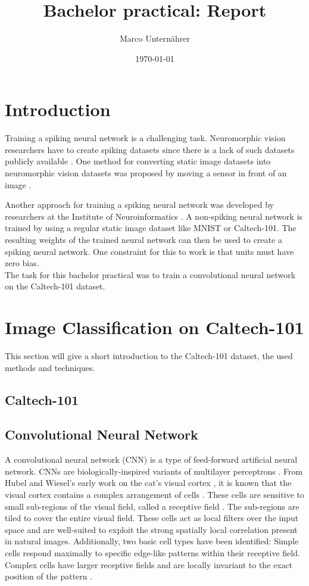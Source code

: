 \documentclass[a4paper, 11pt]{article}
\title{Bachelor practical: Report}
\author{Marco Unternährer}
\date{\today}
\begin{document}
\maketitle

\section{Introduction}

Training a spiking neural network is a challenging task.
Neuromorphic vision researchers have to create spiking datasets since there is a lack of such datasets publicly available .
One method for converting static image datasets into neuromorphic vision datasets was proposed by moving a sensor in front of an image \cite{Orchard2015}.

Another approach for training a spiking neural network was developed by researchers at the Institute of Neuroinformatics \cite{Diehl2015}.
A non-spiking neural network is trained by using a regular static image dataset like MNIST or Caltech-101.
The resulting weights of the trained neural network can then be used to create a spiking neural network.
One constraint for this to work is that units must have zero bias.\\

The task for this bachelor practical was to train a convolutional neural network on the Caltech-101 dataset.


\section{Image Classification on Caltech-101}
This section will give a short introduction to the Caltech-101 dataset, the used methods and techniques.

\subsection{Caltech-101}
\cite{Fei-Fei2007}


\subsection{Convolutional Neural Network}
A convolutional neural network (CNN) is a type of feed-forward artificial neural network.
CNNs are biologically-inspired variants of multilayer perceptrons \cite{DLCNN}.
From Hubel and Wiesel's early work on the cat's visual cortex \cite{Hubel1968}, it is known that the visual cortex contains a complex arrangement of cells \cite{DLCNN}.
These cells are sensitive to small sub-regions of the visual field, called a receptive field \cite{DLCNN}.
The sub-regions are tiled to cover the entire visual field.
These cells act as local filters over the input space and are well-suited to exploit the strong spatially local correlation present in natural images.
Additionally, two basic cell types have been identified: Simple cells respond maximally to specific edge-like patterns within their receptive field.
Complex cells have larger receptive fields and are locally invariant to the exact position of the pattern \cite{DLCNN}.
\end{document}

